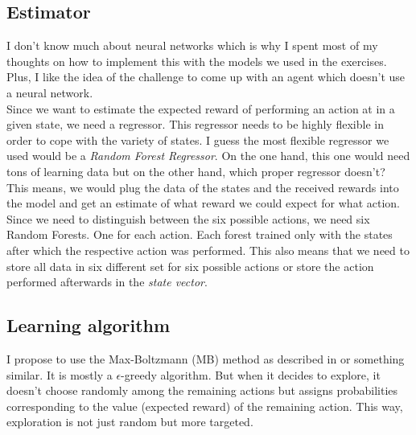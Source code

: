 \documentclass[12pt]{report}
\begin{document}
\subsection{Estimator} 
I don't know much about neural networks which is why I spent most of my thoughts on how to implement this with the models we used in the exercises. Plus, I like the idea of the challenge to come up with an agent which doesn't use a neural network. \\
Since we want to estimate the expected reward of performing an action at in a given state, we need a regressor. This regressor needs to be highly flexible in order to cope with the variety of states. I guess the most flexible regressor we used would be a \textit{Random Forest Regressor}. On the one hand, this one would need tons of learning data but on the other hand, which proper regressor doesn't?\\
This means, we would plug the data of the states and the received rewards into the model and get an estimate of what reward we could expect for what action. Since we need to distinguish between the six possible actions, we need six Random Forests. One for each action. Each forest trained only with the states after which the respective action was performed. This also means that we need to store all data in six different set for six possible actions or store the action performed afterwards in the \textit{state vector}.

\subsection{Learning algorithm}
I propose to use the Max-Boltzmann (MB) method as described in \cite{paper} or something similar. It is mostly a $\epsilon$-greedy algorithm. But when it decides to explore, it doesn't choose randomly among the remaining actions but assigns probabilities corresponding to the value (expected reward) of the remaining action. This way, exploration is not just random but more targeted.\par
\end{document}
